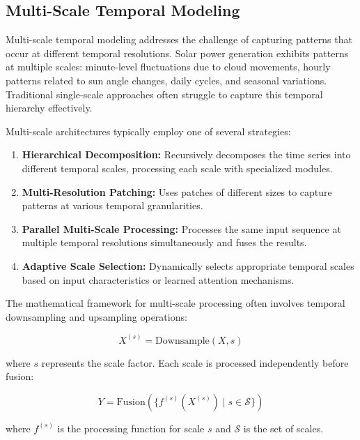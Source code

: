 \documentclass[12pt]{uomthesis}
\begin{document}
\subsection{Multi-Scale Temporal Modeling}

Multi-scale temporal modeling addresses the challenge of capturing patterns that occur at different temporal resolutions. Solar power generation exhibits patterns at multiple scales: minute-level fluctuations due to cloud movements, hourly patterns related to sun angle changes, daily cycles, and seasonal variations. Traditional single-scale approaches often struggle to capture this temporal hierarchy effectively.

Multi-scale architectures typically employ one of several strategies:

\begin{enumerate}
\item \textbf{Hierarchical Decomposition:} Recursively decomposes the time series into different temporal scales, processing each scale with specialized modules.

\item \textbf{Multi-Resolution Patching:} Uses patches of different sizes to capture patterns at various temporal granularities.

\item \textbf{Parallel Multi-Scale Processing:} Processes the same input sequence at multiple temporal resolutions simultaneously and fuses the results.

\item \textbf{Adaptive Scale Selection:} Dynamically selects appropriate temporal scales based on input characteristics or learned attention mechanisms.
\end{enumerate}

The mathematical framework for multi-scale processing often involves temporal downsampling and upsampling operations:

\begin{equation}
X^{(s)} = \text{Downsample}(X, s)
\end{equation}

where $s$ represents the scale factor. Each scale is processed independently before fusion:

\begin{equation}
Y = \text{Fusion}(\{f^{(s)}(X^{(s)}) \mid s \in \mathcal{S}\})
\end{equation}

where $f^{(s)}$ is the processing function for scale $s$ and $\mathcal{S}$ is the set of scales.
\end{document}
